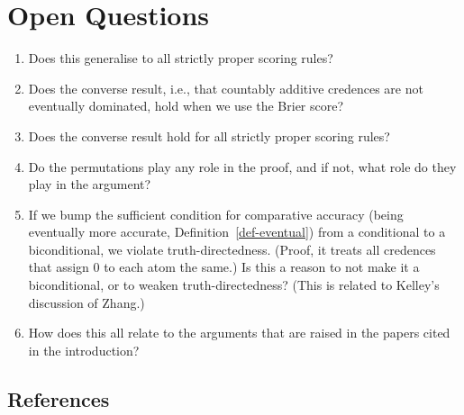 \documentclass[
  11pt,
  letterpaper,
  DIV=11,
  numbers=noendperiod,
  twoside]{scrartcl}
\providecommand{\tightlist}{%
  \setlength{\itemsep}{0pt}\setlength{\parskip}{0pt}}
\theoremstyle{definition}
\theoremstyle{plain}
\theoremstyle{plain}
\theoremstyle{remark}
\begin{document}
\section{Open Questions}\label{open-questions}

\begin{enumerate}
\def\labelenumi{\arabic{enumi}.}
\tightlist
\item
  Does this generalise to all strictly proper scoring rules?
\item
  Does the converse result, i.e., that countably additive credences are
  not eventually dominated, hold when we use the Brier score?
\item
  Does the converse result hold for all strictly proper scoring rules?
\item
  Do the permutations play any role in the proof, and if not, what role
  do they play in the argument?
\item
  If we bump the sufficient condition for comparative accuracy (being
  eventually more accurate, Definition~\ref{def-eventual}) from a
  conditional to a biconditional, we violate truth-directedness. (Proof,
  it treats all credences that assign 0 to each atom the same.) Is this
  a reason to not make it a biconditional, or to weaken
  truth-directedness? (This is related to Kelley's discussion of Zhang.)
\item
  How does this all relate to the arguments that are raised in the
  papers cited in the introduction?
\end{enumerate}

\subsection*{References}\label{references}
\end{document}
